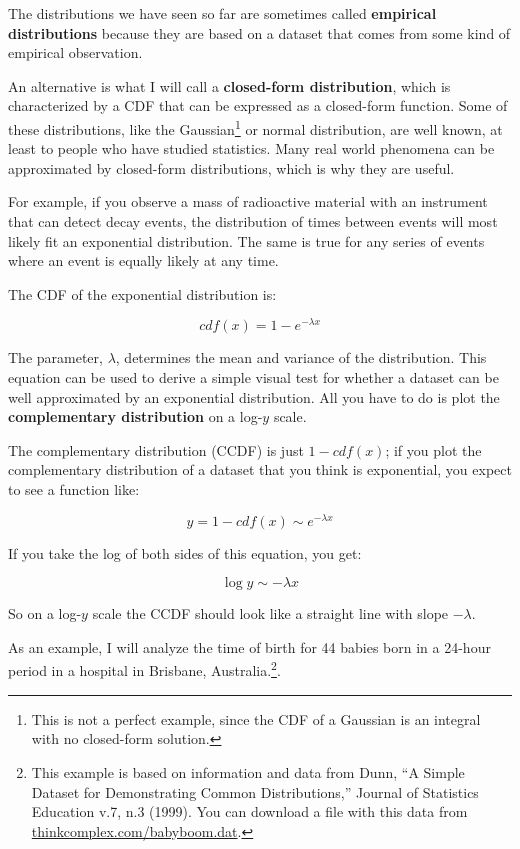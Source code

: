 \documentclass[10pt]{book}
\begin{document}
The distributions we have seen so far are sometimes called
{\bf empirical distributions} because they are based on a
dataset that comes from some kind of empirical observation.

An alternative is what I will call a {\bf closed-form distribution},
which is characterized by a CDF that can be expressed as a closed-form
function.  Some of these distributions, like the
Gaussian\footnote{This is not a perfect example, since the CDF of a
  Gaussian is an integral with no closed-form solution.} or normal
distribution, are well known, at least to people who have studied
statistics.  Many real world phenomena can be approximated by
closed-form distributions, which is why they are useful.

For example, if you observe a mass of radioactive material with
an instrument that can detect decay events, the distribution
of times between events will most likely fit an exponential
distribution.  The same is true for any series of events where
an event is equally likely at any time.

The CDF of the exponential distribution is:

\[ cdf(x) = 1 - e^{-\lambda x} \]

The parameter, $\lambda$, determines the mean and variance
of the distribution.  This equation can be used to derive
a simple visual test for whether a dataset can be well
approximated by an exponential distribution.  All you
have to do is plot the {\bf complementary distribution}
on a log-$y$ scale.

The complementary distribution (CCDF) is just $1 - cdf(x)$; 
if you plot the complementary distribution of a dataset
that you think is exponential, you expect to see a function
like:

\[ y = 1 - cdf(x) \sim e^{-\lambda x} \]

If you take the log of both sides of this equation, you get:

\[ \log y \sim -\lambda x \]

So on a log-$y$ scale the CCDF should look like a straight line
with slope $-\lambda$.

As an example, I will analyze the time of
birth for 44 babies born in a 24-hour period in a hospital in
Brisbane, Australia.\footnote{This example is based on information
  and data from Dunn, ``A Simple Dataset for Demonstrating Common
  Distributions,'' Journal of Statistics Education v.7, n.3 (1999).
You can download a file with this data from 
\url{thinkcomplex.com/babyboom.dat}.}.
\end{document}
